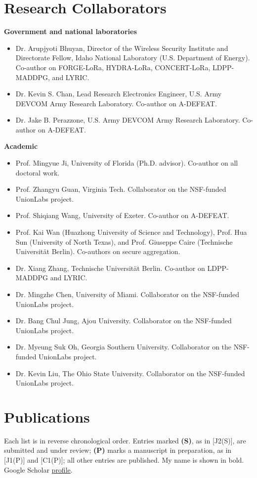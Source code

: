 \documentclass[10pt]{article}
\begin{document}
\section*{Research Collaborators}
\textbf{Government and national laboratories}
\begin{itemize}
\item Dr. Arupjyoti Bhuyan, Director of the Wireless Security Institute and Directorate Fellow, Idaho National Laboratory (U.S. Department of Energy). Co-author on FORGE-LoRa, HYDRA-LoRa, CONCERT-LoRa, LDPP-MADDPG, and LYRIC.
\item Dr. Kevin S. Chan, Lead Research Electronics Engineer, U.S. Army DEVCOM Army Research Laboratory. Co-author on A-DEFEAT.
\item Dr. Jake B. Perazzone, U.S. Army DEVCOM Army Research Laboratory. Co-author on A-DEFEAT.
\end{itemize}
\textbf{Academic}
\begin{itemize}
\item Prof. Mingyue Ji, University of Florida (Ph.D. advisor). Co-author on all doctoral work.
\item Prof. Zhangyu Guan, Virginia Tech. Collaborator on the NSF-funded UnionLabs project.
\item Prof. Shiqiang Wang, University of Exeter. Co-author on A-DEFEAT.
\item Prof. Kai Wan (Huazhong University of Science and Technology), Prof. Hua Sun (University of North Texas), and Prof. Giuseppe Caire (Technische Universit\"at Berlin). Co-authors on secure aggregation.
\item Dr. Xiang Zhang, Technische Universit\"at Berlin. Co-author on LDPP-MADDPG and LYRIC.
\item Dr. Mingzhe Chen, University of Miami. Collaborator on the NSF-funded UnionLabs project.
\item Dr. Bang Chul Jung, Ajou University. Collaborator on the NSF-funded UnionLabs project.
\item Dr. Myeung Suk Oh, Georgia Southern University. Collaborator on the NSF-funded UnionLabs project.
\item Dr. Kevin Liu, The Ohio State University. Collaborator on the NSF-funded UnionLabs project.
\end{itemize}

\section*{Publications}
Each list is in reverse chronological order. Entries marked \textbf{(S)}, as in [J2(S)], are submitted and under review; \textbf{(P)} marks a manuscript in preparation, as in [J1(P)] and [C1(P)]; all other entries are published. My name is shown in bold. Google Scholar \href{https://scholar.google.com/citations?user=gwTaRUkAAAAJ&hl=en}{profile}.
\end{document}

